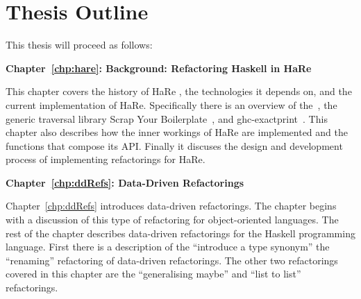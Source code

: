\section{Thesis Outline}

This thesis will proceed as follows:


\DIFaddbegin \textbf{}




\DIFaddend \textbf{Chapter~\ref{chp:hare}: Background: Refactoring Haskell in HaRe}

This chapter covers the history of HaRe \DIFaddbegin {}\textbf{}\textbf{}\DIFaddend , the technologies it depends on, and the current implementation of HaRe. Specifically there is an overview of the\DIFdelbegin {}\DIFdelend ~\citep{ghcApi}, the generic traversal library Scrap Your Boilerplate~\citep{syb}, and ghc-exactprint~\citep{exactprint}. This chapter also describes how the inner workings of HaRe are implemented and the functions that compose its API. Finally it discuses the design and development process of implementing refactorings for HaRe.

\textbf{Chapter~\ref{chp:ddRefs}: Data-Driven Refactorings}

Chapter~\ref{chp:ddRefs} introduces data-driven refactorings. The chapter begins with a discussion of this type of refactoring for object-oriented languages. The rest of the chapter describes data-driven refactorings for the Haskell programming language. First there is a description of the ``introduce a type synonym\DIFaddbegin \DIFadd{,}\DIFaddend '' the ``renaming'' refactoring of data-driven refactorings. The \DIFaddbegin {}\DIFaddend other two refactorings covered in this chapter are the ``generalising maybe'' and ``list to \DIFdelbegin {}\DIFdelend \DIFaddbegin {}\DIFaddend list'' refactorings.

